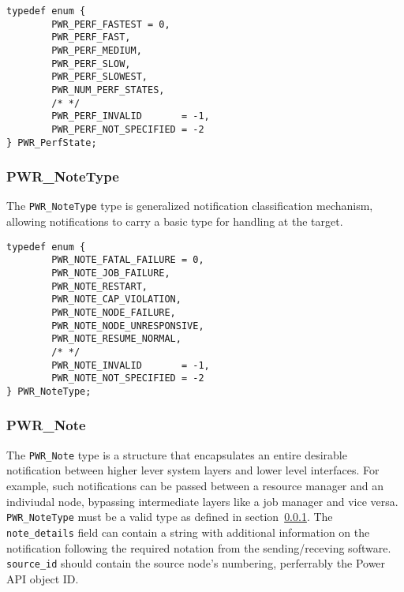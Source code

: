 \begin{center}
\begin{minipage}{.95\linewidth}%
\begin{lstlisting}
typedef enum {
        PWR_PERF_FASTEST = 0,
        PWR_PERF_FAST,
        PWR_PERF_MEDIUM,
        PWR_PERF_SLOW,
        PWR_PERF_SLOWEST,
        PWR_NUM_PERF_STATES,
        /* */
        PWR_PERF_INVALID       = -1,
        PWR_PERF_NOT_SPECIFIED = -2
} PWR_PerfState;
\end{lstlisting}
\end{minipage}
\end{center}


\subsubsection{PWR_NoteType}\label{type:NoteType}

The \texttt{PWR_NoteType} type is generalized notification classification mechanism,
allowing notifications to carry a basic type for handling at the target.

\begin{center}
\begin{minipage}{.95\linewidth}%
\begin{lstlisting}
typedef enum {
        PWR_NOTE_FATAL_FAILURE = 0,
        PWR_NOTE_JOB_FAILURE,
        PWR_NOTE_RESTART,
        PWR_NOTE_CAP_VIOLATION,
        PWR_NOTE_NODE_FAILURE,
        PWR_NOTE_NODE_UNRESPONSIVE,
        PWR_NOTE_RESUME_NORMAL,
        /* */
        PWR_NOTE_INVALID       = -1,
        PWR_NOTE_NOT_SPECIFIED = -2
} PWR_NoteType; 
\end{lstlisting}
\end{minipage}
\end{center}



\subsubsection{PWR_Note}\label{type:Note}

The \texttt{PWR_Note} type is a structure that encapsulates an entire desirable 
notification between higher lever system layers and lower level interfaces. For example,
such notifications can be passed between a resource manager and an indiviudal node, bypassing
intermediate layers like a job manager and vice versa. \texttt{PWR_NoteType} must be a valid
type as defined in section~\ref{type:NoteType}. The \texttt{note_details} field can contain a 
string with additional information on the notification following the required notation from
the sending/receving software. \texttt{source_id} should contain the source node's numbering,
perferrably the Power API object ID.  

